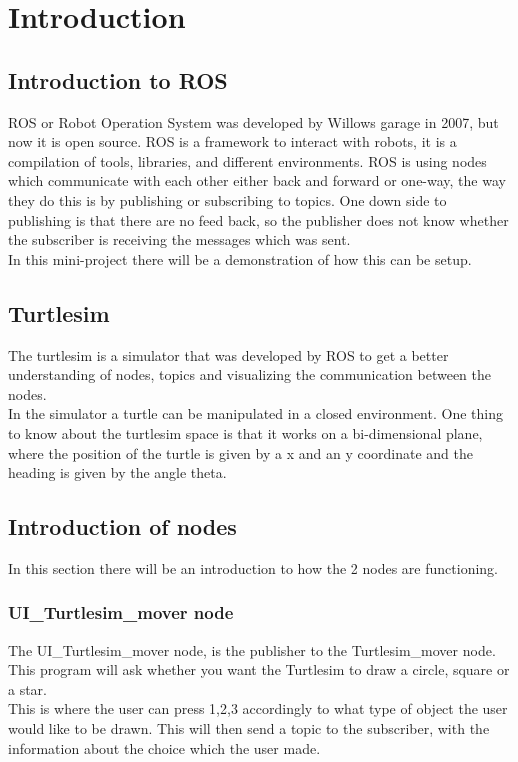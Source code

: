 \chapter{Introduction}

\section{Introduction to ROS}
ROS or Robot Operation System was developed by Willows garage in 2007, but now it is open source. ROS is a framework to interact with robots, it is a compilation of tools, libraries, and different environments\cite{ROSINTRO}. ROS is using nodes which communicate with each other either back and forward or one-way, the way they do this is by publishing or subscribing to topics. One down side to publishing is that there are no feed back, so the publisher does not know whether the subscriber is receiving the messages which was sent.\\
In this mini-project there will be a demonstration of how this can be setup.

\section{Turtlesim}

The turtlesim is a simulator that was developed by ROS to get a better understanding of nodes, topics and visualizing the communication between the nodes.\\
In the simulator a turtle can be manipulated in a closed environment. One thing to know about the turtlesim space is that it works on a bi-dimensional plane, where the position of the turtle is given by a x and an y coordinate and the heading is given by the angle theta.

\section{Introduction of nodes}\label{ch:introduction}


In this section there will be an introduction to how the 2 nodes are functioning. 

\subsection{UI\_Turtlesim\_mover node}

The UI\_Turtlesim\_mover node, is the publisher to the Turtlesim\_mover node.\\
This program will ask whether you want the Turtlesim to draw a circle, square or a star.\\
This is where the user can press 1,2,3 accordingly to what type of object the user would like to be drawn. This will then send a topic to the subscriber, with the information about the choice which the user made.\\


